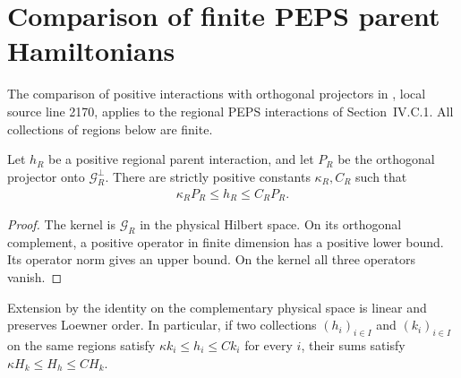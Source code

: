\section{Comparison of finite PEPS parent Hamiltonians}%
\label{sec:peps_region_parent_comparison}

The comparison of positive interactions with orthogonal projectors in
\cite[Section~IV.C.3]{Cirac2021Matrix}, local source line 2170, applies
to the regional PEPS interactions of Section~IV.C.1. All collections of
regions below are finite.

\begin{lemma}%
    \label{thm:peps_region_parent_projection_comparison}
    \leanok
    Let $h_R$ be a positive regional parent interaction, and let $P_R$
    be the orthogonal projector onto $\mathcal G_R^\perp$. There are
    strictly positive constants $\kappa_R,C_R$ such that
    \begin{align}
        \kappa_R P_R\le h_R\le C_R P_R.
        \label{eq:peps_region_parent_bounds}
    \end{align}
\end{lemma}

\begin{proof}\leanok
    The kernel is $\mathcal G_R$ in the physical Hilbert space.
    On its orthogonal complement, a positive operator in finite
    dimension has a positive lower bound. Its operator norm gives
    an upper bound. On the kernel all three operators vanish.
\end{proof}

\begin{lemma}%
    \label{thm:peps_region_extension_order}
    \leanok
    Extension by the identity on the complementary physical space
    is linear and preserves Loewner order. In particular, if two
    collections $(h_i)_{i\in I}$ and $(k_i)_{i\in I}$ on the same
    regions satisfy $\kappa k_i\le h_i\le Ck_i$ for every $i$, their
    sums satisfy $\kappa H_k\le H_h\le CH_k$.
\end{lemma}

